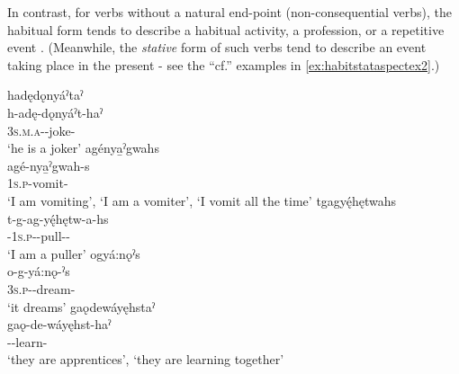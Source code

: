 In contrast, for verbs without a natural end-point (non-consequential verbs), the habitual form tends to describe a habitual activity, a profession, or a repetitive event . (Meanwhile, the \emph{stative} form of such verbs tend to describe an event taking place in the present - see the “cf.” examples in \ref{ex:habitstataspectex2}.)

\ea\label{ex:habitstataspectex2}
\ea hadędǫnyáˀtaˀ\\
\gll h-adę-dǫnyáˀt-haˀ\\
 \textsc{3s.m.a}-{\semireflexive}-joke-{\habitual}\\
\glt `he is a joker'
 \newpage
\ex agénya̱ˀgwahs \\
\gll agé-nya̱ˀgwah-s\\
 \textsc{1s.p}-vomit-{\habitual}\\
\glt ‘I am vomiting’, ‘I am a vomiter’, `I vomit all the time'
\ex tgagyę́hętwahs\\
\gll t-g-ag-yę́hętw-a-hs\\
 {\cislocative}-\textsc{1s.p}-{\semireflexive}-pull-{\joinerA}-{\habitual}\\
\glt `I am a puller'
\ex ogyá:nǫˀs\\
\gll o-g-yá:nǫ-ˀs\\
 \textsc{3s.p}-{\semireflexive}-dream-{\habitual}\\
\glt `it dreams'
\ex gaǫdewáyęhstaˀ \\
\gll gaǫ-de-wáyęhst-haˀ\\
 -{\semireflexive}-learn-{\habitual}\\
\glt ‘they are apprentices’, `they are learning together'
\z
\z

